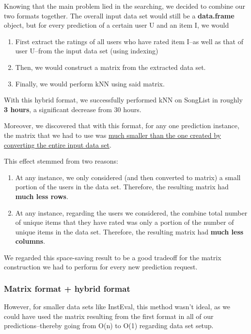 \documentclass{article}
\begin{document}
Knowing that the main problem lied in the searching, we decided to combine our two formats together. The overall input data set would still be a \textbf{data.frame} object, but for every prediction of a certain user U and an item I, we would

\begin{enumerate}
    \item First extract the ratings of all users who have rated item I--as well as that of user U--from the input data set (using indexing)
    \item Then, we would construct a matrix from the extracted data set.
    \item Finally, we would perform kNN using said matrix. 
\end{enumerate}

With this hybrid format, we successfully performed kNN on SongList in roughly \textbf{3 hours}, a significant decrease from 30 hours.

Moreover, we discovered that with this format, for any one prediction instance, the matrix that we had to use was \underline{much smaller than the one created by} \underline{converting the entire input data set}.

This effect stemmed from two reasons:

\begin{enumerate}
    \item At any instance, we only considered (and then converted to matrix) a small portion of the users in the data set. Therefore, the resulting matrix had \textbf{much less rows}.
    \item At any instance, regarding the users we considered, the combine total number of unique items that they have rated was only a portion of the number of unique items in the data set. Therefore, the resulting matrix had \textbf{much less columns}.
\end{enumerate}

We regarded this space-saving result to be a good tradeoff for the matrix construction we had to perform for every new prediction request.

\subsubsection{Matrix format + hybrid format}

However, for smaller data sets like InstEval, this method wasn't ideal, as we could have used the matrix resulting from the first format in all of our predictions--thereby going from O(n) to O(1) regarding data set setup. 
\end{document}
